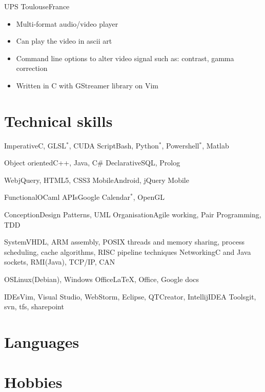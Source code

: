 \documentclass[a4paper,11pt]{moderncv}
\begin{document}
{UPS Toulouse}{France}
{
    \begin{itemize}
        \item Multi-format audio/video player
        \item Can play the video in ascii art
        \item Command line options to alter video signal such as: contrast, gamma correction
        \item Written in C with GStreamer library on Vim
    \end{itemize}
}

\section{Technical skills}
\cvdoubleitem
{Imperative}{C, GLSL$^*$, CUDA}
{Script}{Bash, Python$^*$, Powershell$^*$, Matlab}

\cvdoubleitem
{Object oriented}{C++, Java, C\#}
{Declarative}{SQL, Prolog}

\cvdoubleitem
{Web}{jQuery, HTML5, CSS3}
{Mobile}{Android, jQuery Mobile}

\cvdoubleitem
{Functional}{OCaml}
{APIs}{Google Calendar$^*$, OpenGL}

\cvdoubleitem
{Conception}{Design Patterns, UML}
{Organisation}{Agile working, Pair Programming, TDD}

\cvdoubleitem
{System}{VHDL, ARM assembly, POSIX threads and memory sharing, process scheduling, cache algorithms, RISC pipeline techniques}
{Networking}{C and Java sockets, RMI(Java), TCP/IP, CAN}

\cvdoubleitem
{OS}{Linux(Debian), Windows}
{Office}{LaTeX, Office, Google docs}

\cvdoubleitem
{IDEs}{Vim, Visual Studio, WebStorm, Eclipse, QTCreator, IntellijIDEA}
{Tools}{git, svn, tfs, sharepoint}



\section{Languages}


\section{Hobbies}
\end{document}
